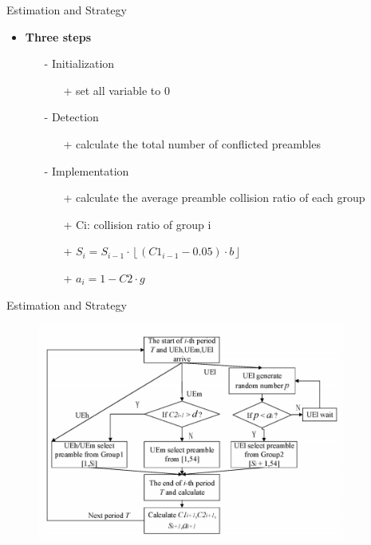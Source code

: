\documentclass{beamer}
\begin{document}
\begin{frame} {Estimation and Strategy }
    \begin{itemize}
        \item \textbf{Three steps}
        \begin{itemize}
            \item[-] Initialization
            \begin{itemize}
                \item[+] set all variable to 0
            \end{itemize}
            \item[-] Detection
            \begin{itemize}
                \item[+] calculate the total number of conflicted preambles
            \end{itemize}
            \item[-] Implementation
            \begin{itemize}
                \item[+] calculate the average preamble collision ratio of each group
                \item[+] Ci: collision ratio of group i
                \item[+] $S_{i} = S_{i-1} \cdot  \left \lfloor \left ( C1_{i-1}-0.05 \right )\cdot b \right \rfloor$
                \item[+] $a_{i} = 1 - C2 \cdot g$
            \end{itemize}
        \end{itemize}
         
    \end{itemize}
\end{frame}
\begin{frame} {Estimation and Strategy }
    \begin{figure}[t]
    \centering
    \includegraphics[width=0.9\textwidth]{figures/p2.png}
\end{figure}
\end{frame}
\end{document}
